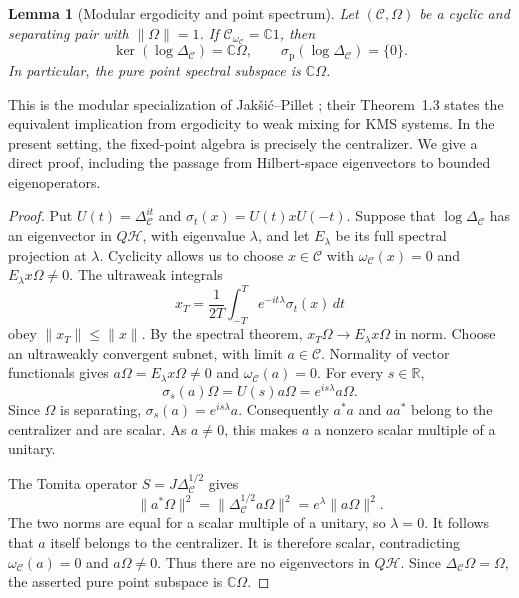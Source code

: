 \documentclass[a4paper,11pt]{article}
\newtheorem{lemma}[theorem]{Lemma}
\theoremstyle{definition}
\begin{document}
\begin{lemma}[Modular ergodicity and point spectrum]\label{lem:appC-no-point-spectrum}
Let $(\mathcal C,\Omega)$ be a cyclic and separating pair with $\|\Omega\|=1$. If $\mathcal C_{\omega_{\mathcal C}}=\mathbb C1$, then
\begin{equation}
 \ker(\log\Delta_{\mathcal C})=\mathbb C\Omega,
 \qquad
 \sigma_{\mathrm p}(\log\Delta_{\mathcal C})=\{0\}.
 \label{eq:appC-modular-point-spectrum}
\end{equation}
In particular, the pure point spectral subspace is $\mathbb C\Omega$.
\end{lemma}

This is the modular specialization of Jak\v{s}i\'c--Pillet \cite[Theorem~1.2]{JaksicPillet2001Liouvilleans}; their Theorem~1.3 states the equivalent implication from ergodicity to weak mixing for KMS systems. In the present setting, the fixed-point algebra is precisely the centralizer. We give a direct proof, including the passage from Hilbert-space eigenvectors to bounded eigenoperators.

\begin{proof}
Put $U(t)=\Delta_{\mathcal C}^{it}$ and $\sigma_t(x)=U(t)xU(-t)$. Suppose that $\log\Delta_{\mathcal C}$ has an eigenvector in $Q\mathcal H$, with eigenvalue $\lambda$, and let $E_\lambda$ be its full spectral projection at $\lambda$. Cyclicity allows us to choose $x\in\mathcal C$ with $\omega_{\mathcal C}(x)=0$ and $E_\lambda x\Omega\ne0$. The ultraweak integrals
\begin{equation}
 x_T=\frac1{2T}\int_{-T}^{T}e^{-it\lambda}\sigma_t(x)\,dt
 \label{eq:appC-eigenoperator-averages}
\end{equation}
obey $\|x_T\|\le\|x\|$. By the spectral theorem,
$x_T\Omega\to E_\lambda x\Omega$ in norm. Choose an ultraweakly convergent subnet, with limit $a\in\mathcal C$. Normality of vector functionals gives
$a\Omega=E_\lambda x\Omega\ne0$ and $\omega_{\mathcal C}(a)=0$.
For every $s\in\mathbb R$,
\[
 \sigma_s(a)\Omega=U(s)a\Omega=e^{is\lambda}a\Omega .
\]
Since $\Omega$ is separating, $\sigma_s(a)=e^{is\lambda}a$. Consequently $a^*a$ and $aa^*$ belong to the centralizer and are scalar. As $a\ne0$, this makes $a$ a nonzero scalar multiple of a unitary.

The Tomita operator $S=J\Delta_{\mathcal C}^{1/2}$ gives
\begin{equation}
 \|a^*\Omega\|^2=\|\Delta_{\mathcal C}^{1/2}a\Omega\|^2
 =e^\lambda\|a\Omega\|^2 .
 \label{eq:appC-eigenoperator-balance}
\end{equation}
The two norms are equal for a scalar multiple of a unitary, so $\lambda=0$. It follows that $a$ itself belongs to the centralizer. It is therefore scalar, contradicting $\omega_{\mathcal C}(a)=0$ and $a\Omega\ne0$. Thus there are no eigenvectors in $Q\mathcal H$. Since $\Delta_{\mathcal C}\Omega=\Omega$, the asserted pure point subspace is $\mathbb C\Omega$.
\end{proof}
\end{document}
